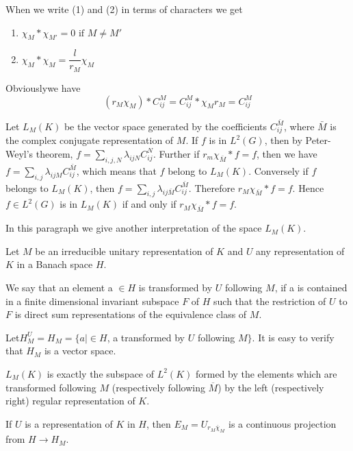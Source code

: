 When we write (1) and (2) in terms of characters we get 
\begin{enumerate}[(1)]
\item $\chi_M * \chi_{M'}= 0 \text{ if } M \neq M'$
\item $\chi_M * \chi_M =\dfrac{l}{r_M} \chi_M$
\end{enumerate}
Obviously\pageoriginale we have 
$$
(r_M \chi_M)* C^M_{ij} = C^M_{ij} * \chi_M r_M = C^M_{ij}
$$

Let $L_M(K)$ be the vector space generated by the coefficients
$C^{\bar M}_{ij}$, where $\bar M$ is the complex conjugate
representation of $M$. If $f$ is in $L^2(G)$, then by Peter-Weyl's
theorem, $f =\sum \limits_{i,j,N} \lambda_{ijN} C^N_{ij}$. Further if
$r_m \chi_{\bar M} *f=f$, then we have $ f =\sum \limits_{i,j}
\lambda_{ijM} C^{\bar M}_{ij}$, which means that $f$ belong to
$L_M(K)$. Conversely if $f$ belongs to $L_M(K)$, then $ f =\sum
\limits_{i,j} \lambda_{ij\bar M} C^{\bar M}_{ij}$. Therefore $r_M \chi
_{\bar M}*f=f$. Hence $f \in L^2(G)$ is in $L_M(K)$ if and only if $
r_M \chi _{\bar M}*f=f$. 

In this paragraph we give another interpretation of the space
$L_M(K)$. 

\begin{defi*}
Let $M$ be an irreducible unitary representation of $K$ and $U$ any
representation of $K$ in a Banach space $H$. 
\end{defi*}

We say that an element a $\in H $ is transformed by $U$ following $M$,
if a is contained in a finite dimensional invariant subspace $F$ of
$H$ such that the restriction of $U$ to $F$ is direct sum
representations of the equivalence class of $M$. 

Let\pageoriginale $H^U_M=H_M=\{a \mid \in H$, a transformed by $U$ following $M
\}$. It is easy to verify that $H_M$ is a vector space. 

\setcounter{proposition}{0}
 \begin{proposition}\label{part2:chap1:sec1:prop1}
   $L_M(K)$ is exactly the subspace of $L^2(K)$ formed by the elements
   which are transformed following $M$ (respectively following
   $\overline {M}$) by the left (respectively right) regular
   representation of $K$.		 
 \end{proposition} 
 
 \begin{proposition}\label{part2:chap1:sec1:prop2}
   If $U$ is a representation of $K$ in $H$, then $E_M=U_{r_M
     \overline{\chi}_M}$ is a continuous projection from $H\to H_M$. 
 \end{proposition} 
 
